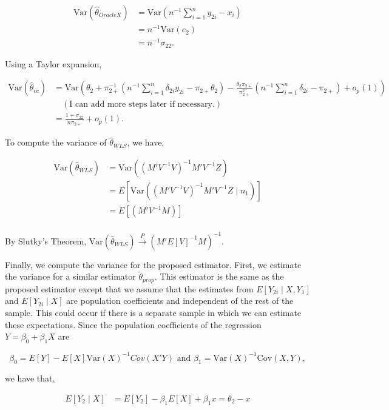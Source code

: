 \documentclass[12pt]{article}
\newcommand{\Cov}{{\text{Cov}}}
\newcommand{\Var}{{\text{Var}}}
\begin{document}
\begin{align}\label{eq:varorx}
  \Var(\hat \theta_{OracleX}) 
  &= \Var\left(n^{-1} \sum_{i = 1}^n y_{2i} - x_i\right) \nonumber \\
  &= n^{-1} \Var(e_{2}) \nonumber \\
  &= n^{-1} \sigma_{22}.
\end{align}

Using a Taylor expansion,

\begin{align}\label{eq:varcc}
  \Var(\hat \theta_{cc})
  &= \Var\left(\theta_2 + \pi_{2+}^{-1} \left(n^{-1}\sum_{i = 1}^n \delta_{2i} y_{2i}
  - \pi_{2+}\theta_2\right) - \frac{\theta_2 \pi_{2+}}{\pi_{2+}^2} 
  \left(n^{-1} \sum_{i = 1}^n \delta_{2i} - \pi_{2+}\right) + o_p(1)\right)\nonumber  \\
  &\quad (\text{I can add more steps later if necessary.})\\
  &= \frac{1 + \sigma_{22}}{n \pi_{2+}} + o_p(1).
\end{align}

To compute the variance of $\hat \theta_{WLS}$, we have,

\begin{align}\label{eq:varwls}
  \Var(\hat \theta_{WLS})
  &= \Var((M'V^{-1}V)^{-1}M'V^{-1}Z) \nonumber \\ 
  &= E[\Var((M'V^{-1}V)^{-1}M'V^{-1}Z \mid n_1)]\nonumber  \\
  &= E[(M'V^{-1}M)]\\
\end{align}

By Slutky's Theorem, $\Var(\hat \theta_{WLS}) \stackrel{P}{\to} (M'E[V]^{-1}M)^{-1}$.

Finally, we compute the variance for the proposed estimator. First, we
estimate the variance for a similar estimator $\tilde \theta_{prop}$. This
estimator is the same as the proposed estimator except that we assume that 
the estimates from $E[Y_{2i} \mid X, Y_1]$ and $E[Y_{2i} \mid X]$ are 
population coefficients and independent of the rest of the sample. This
could occur if there is a separate sample in which we can estimate these 
expectations. Since the population coefficients of the regression 
$Y = \beta_0 + \beta_1 X$ are

\[\beta_0 = E[Y] - E[X] \Var(X)^{-1} Cov(X'Y) \text{ and } 
\beta_1 = \Var(X)^{-1}\Cov(X, Y),\]

we have that,

\begin{align*}
  E[Y_2 \mid X] &= E[Y_2] - \beta_1 E[X] + \beta_1 x = \theta_2 - x
\end{align*}
\end{document}
